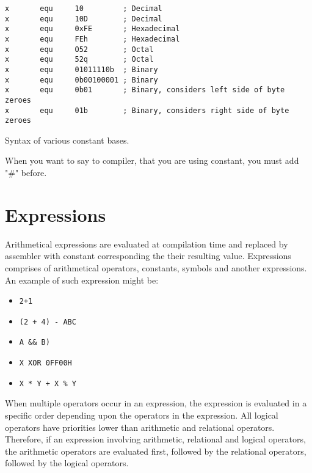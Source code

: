     \begin{code}[h!]
    {
        \usecodefont

        \verb'x       equ     10         ; Decimal'\\
        \verb'x       equ     10D        ; Decimal'\\
        \verb'x       equ     0xFE       ; Hexadecimal'\\
        \verb'x       equ     FEh        ; Hexadecimal'\\
        \verb'x       equ     O52        ; Octal'\\
        \verb'x       equ     52q        ; Octal'\\
        \verb'x       equ     01011110b  ; Binary'\\
        \verb'x       equ     0b00100001 ; Binary'\\
        \verb'x       equ     0b01       ; Binary, considers left side of byte zeroes'\\
        \verb'x       equ     01b        ; Binary, considers right side of byte zeroes'

        \caption{Syntax of various constant bases.}
        \label{code:svcb}
    }
    \end{code}

    When you want to say to compiler, that you are using constant, you must add "\#" before.

\clearpage
\section{Expressions}
    Arithmetical expressions are evaluated at compilation time and replaced by assembler with constant corresponding the their resulting value. Expressions comprises of arithmetical operators, constants, symbols and another expressions. An example of such expression might be:

    \begin{itemize}
        \item \texttt{2+1}
        \item \texttt{(2 + 4) - ABC}
        \item \texttt{A \&\& B)}
        \item \texttt{X XOR 0FF00H}
        \item \texttt{X * Y + X \% Y}
    \end{itemize}

    When multiple operators occur in an expression, the expression is evaluated in a specific order depending upon the operators in the expression. All logical operators have priorities lower than arithmetic and relational operators. Therefore, if an expression involving arithmetic, relational and logical operators, the arithmetic operators are evaluated first, followed by the relational operators, followed by the logical operators.

